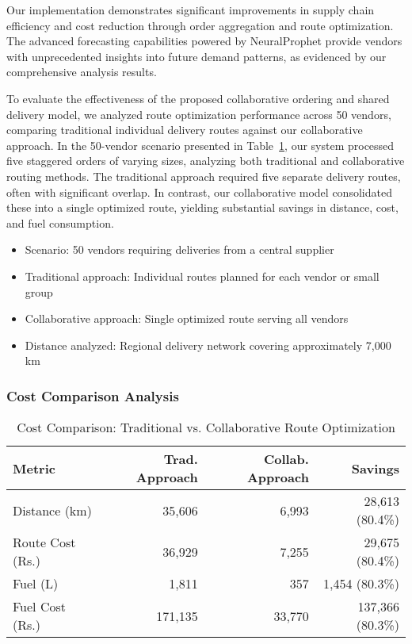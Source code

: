 Our implementation demonstrates significant improvements in supply chain efficiency and cost reduction through order aggregation and route optimization. The advanced forecasting capabilities powered by NeuralProphet provide vendors with unprecedented insights into future demand patterns, as evidenced by our comprehensive analysis results.

To evaluate the effectiveness of the proposed collaborative ordering and shared delivery model, we analyzed route optimization performance across 50 vendors, comparing traditional individual delivery routes against our collaborative approach. In the 50-vendor scenario presented in Table~\ref{tab:cost-comparison}, our system processed five staggered orders of varying sizes, analyzing both traditional and collaborative routing methods. The traditional approach required five separate delivery routes, often with significant overlap. In contrast, our collaborative model consolidated these into a single optimized route, yielding substantial savings in distance, cost, and fuel consumption.
\begin{itemize}
    \item {Scenario:} 50 vendors requiring deliveries from a central supplier
    \item {Traditional approach:} Individual routes planned for each vendor or small group
    \item {Collaborative approach:} Single optimized route serving all vendors
    \item {Distance analyzed:} Regional delivery network covering approximately 7,000 km
\end{itemize}

\subsubsection{Cost Comparison Analysis}

\begin{table}[htbp]
    \centering
    \caption{Cost Comparison: Traditional vs. Collaborative Route Optimization}
    \label{tab:cost-comparison}
    \begin{tabular}{lrrr}
        \toprule
        \textbf{Metric}  & \textbf{Trad. Approach} & \textbf{Collab. Approach} & \textbf{Savings} \\
        \midrule
        Distance (km)    & 35,606                  & 6,993                     & 28,613 (80.4\%)  \\
        Route Cost (Rs.) & 36,929                  & 7,255                     & 29,675 (80.4\%)  \\
        Fuel (L)         & 1,811                   & 357                       & 1,454 (80.3\%)   \\
        Fuel Cost (Rs.)  & 171,135                 & 33,770                    & 137,366 (80.3\%) \\
        \bottomrule
    \end{tabular}
\end{table}

